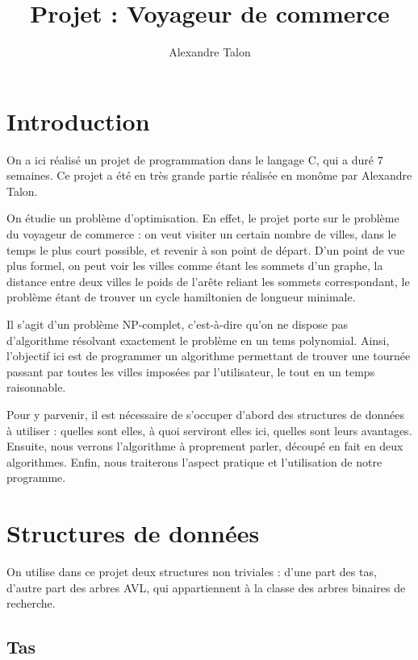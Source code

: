 \documentclass{article}
\title{Projet : Voyageur de commerce}
\author{Alexandre Talon}
\begin{document}
\maketitle
\tableofcontents
\section*{Introduction}
On a ici réalisé un projet de programmation dans le langage C, qui a duré $7$ semaines. Ce projet a été en très grande partie réalisée en monôme par Alexandre Talon.

On étudie un problème d'optimisation. En effet, le projet porte sur le problème du voyageur de commerce : on veut visiter un certain nombre de villes, dans le temps le plus court possible, et revenir à son point de départ. D'un point de vue plus formel, on peut voir les villes comme étant les sommets d'un graphe, la distance entre deux villes le poids de l'arête reliant les sommets correspondant, le problème étant de trouver un cycle hamiltonien de longueur minimale.


Il s'agit d'un problème NP-complet, c'est-à-dire qu'on ne dispose pas d'algorithme résolvant exactement le problème en un tems polynomial. Ainsi, l'objectif ici est de programmer un algorithme permettant de trouver une tournée passant par toutes les villes imposées par l'utilisateur, le tout en un temps raisonnable.


Pour y parvenir, il est nécessaire de s'occuper d'abord des structures de données à utiliser : quelles sont elles, à quoi serviront elles ici, quelles sont leurs avantages. Ensuite, nous verrons l'algorithme à proprement parler, découpé en fait en deux algorithmes. Enfin, nous traiterons l'aspect pratique et l'utilisation de notre programme.

\section{Structures de données}

On utilise dans ce projet deux structures non triviales : d'une part des tas, d'autre part des arbres AVL, qui appartiennent à la classe des arbres binaires de recherche.
\subsection{Tas}
\end{document}
